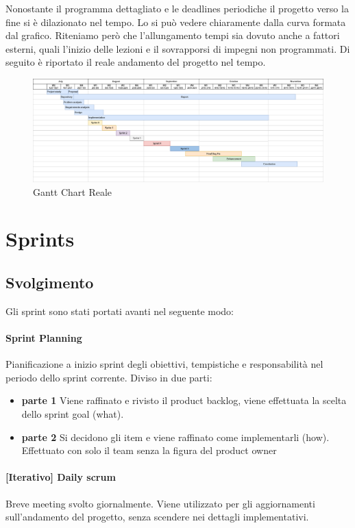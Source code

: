 Nonostante il programma dettagliato e le deadlines periodiche il progetto verso la fine si è dilazionato nel tempo. Lo si può vedere chiaramente dalla curva formata dal grafico. Riteniamo però che l'allungamento tempi sia dovuto anche a fattori esterni, quali l'inizio delle lezioni e il sovrapporsi di impegni non programmati. Di seguito è riportato il reale andamento del progetto nel tempo. 
\begin{figure}[H]
    \caption{Gantt Chart Reale}
    \label{fig:GanttReal}
    \centering
    \includegraphics[width=1\textwidth]{DrawIo/GanttChartReal.png}
\end{figure}

\section{Sprints}

\subsection{Svolgimento}
Gli sprint sono stati portati avanti nel seguente modo:
    \paragraph{Sprint Planning}
        Pianificazione a inizio sprint degli obiettivi, tempistiche e responsabilità nel periodo dello sprint corrente. Diviso in due parti:
        \begin{itemize}
        \item\textbf{parte 1} 
            Viene raffinato e rivisto il product backlog, viene effettuata la scelta dello sprint goal (what).
        \item\textbf{parte 2}
            Si decidono gli item e viene raffinato come implementarli (how). Effettuato con solo il team senza la figura del product owner
        \end{itemize}
    \paragraph{[Iterativo] Daily scrum} Breve meeting svolto giornalmente. Viene utilizzato per gli aggiornamenti sull'andamento del progetto, senza scendere nei dettagli implementativi.
